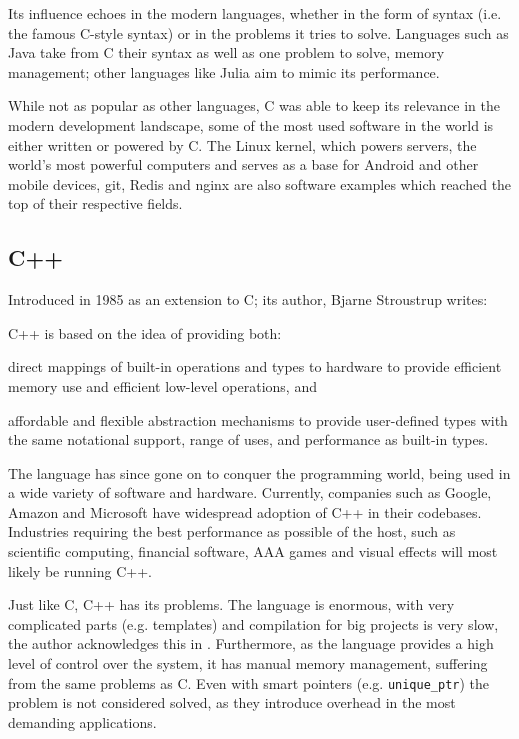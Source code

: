 Its influence echoes in the modern languages,
whether in the form of syntax (i.e. the famous C-style syntax) or in the problems it tries to solve.
Languages such as Java take from C their syntax as well as one problem to solve, memory management;
other languages like Julia \autocite{Bezanson2017} aim to mimic its performance.

While not as popular as other languages, C was able to keep its relevance in the modern development landscape,
some of the most used software in the world is either written or powered by C.
The Linux kernel, which powers servers, the world's most powerful computers
and serves as a base for Android and other mobile devices,
git, Redis and nginx are also software examples which reached the top of their respective fields.

\subsection{C++}

Introduced in 1985 as an extension to C; its author, Bjarne Stroustrup writes:

\begin{displayquote}
    C++  is  based  on  the idea of providing both:
    \begin{compactitem}
        \item direct mappings of built-in operations and types to hardware to provide efficient memory use and efficient low-level operations, and
        \item affordable and flexible abstraction mechanisms to provide user-defined types with the same notational support, range of uses, and performance as built-in types.
    \end{compactitem}
\end{displayquote}

The language has since gone on to conquer the programming world, being used in a wide variety of software and hardware.
Currently, companies such as Google, Amazon and Microsoft have widespread adoption of C++ in their codebases.
Industries requiring the best performance as possible of the host, such as scientific computing,
financial software, AAA games and visual effects will most likely be running C++.

Just like C, C++ has its problems.
The language is enormous, with very complicated parts (e.g. templates) and compilation for big projects is very slow,
the author acknowledges this in \autocite{Torre2014}.
Furthermore, as the language provides a high level of control over the system, it has manual memory management,
suffering from the same problems as C.
Even with smart pointers (e.g. \texttt{unique\_ptr}) the problem is not considered solved,
as they introduce overhead in the most demanding applications.


